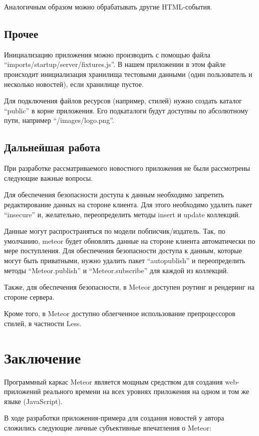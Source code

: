 \documentclass[a4paper,12pt]{article}
\begin{document}
Аналогичным образом можно обрабатывать другие HTML-события.

\subsection{Прочее}
Инициализацию приложения можно производить с помощью файла
``imports/startup/server/fixtures.js''. В нашем приложении
в этом файле происходит инициализация хранилища тестовыми данными
(один пользователь и несколько новостей), если хранилище
пустое.

Для подключения файлов ресурсов (например, стилей) нужно
создать каталог ``public'' в корне приложения. Его
подкаталоги будут доступны по абсолютному пути,
например ``/images/logo.png''.

\subsection{Дальнейшая работа}
При разработке рассматриваемого новостного приложения не были
рассмотрены следующие важные вопросы.

Для обеспечения безопасности доступа к данным необходимо
запретить редактирование данных на стороне клиента.
Для этого необходимо удалить пакет ``insecure''
и, желательно, переопределить методы insert и update
коллекций.

Данные могут распространяться по модели побписчик/издатель.
Так, по умолчанию, meteor будет обновлять данные
на стороне клиента автоматически по мере поступления.
Для обеспечения безопасности доступа к данным, 
которые могут быть приватными, нужно удалить пакет 
``autopublish'' и переопределить методы
``Meteor.publish'' и ``Meteor.subscribe'' для
каждой из коллекций.

Также, для обеспечения безопасности,
в Meteor доступен роутинг и рендеринг 
на стороне сервера.

Кроме того, в Meteor доступно облегченное использование препроцессоров стилей,
в частности Less.

\section*{Заключение}
Программный каркас Meteor является мощным средством для создания
web-приложений реального времени на всех уровнях приложения на одном
и том же языке (JavaScript). 

В ходе разработки приложения-примера для создания новостей у автора
сложились следующие личные субъективные впечатления о Meteor:
\end{document}

